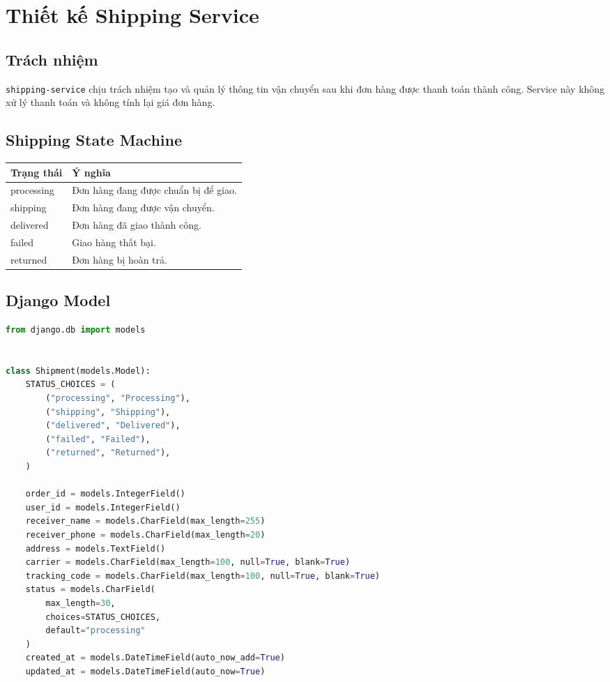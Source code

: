 \section{Thiết kế Shipping Service}

\subsection{Trách nhiệm}

\texttt{shipping-service} chịu trách nhiệm tạo và quản lý thông tin vận chuyển sau khi đơn hàng được thanh toán thành công. Service này không xử lý thanh toán và không tính lại giá đơn hàng.

\subsection{Shipping State Machine}

\begin{longtable}{|p{4cm}|p{9cm}|}
\hline
\textbf{Trạng thái} & \textbf{Ý nghĩa} \\
\hline
processing & Đơn hàng đang được chuẩn bị để giao. \\
\hline
shipping & Đơn hàng đang được vận chuyển. \\
\hline
delivered & Đơn hàng đã giao thành công. \\
\hline
failed & Giao hàng thất bại. \\
\hline
returned & Đơn hàng bị hoàn trả. \\
\hline
\end{longtable}

\subsection{Django Model}

\begin{lstlisting}[style=code,language=Python]
from django.db import models


class Shipment(models.Model):
    STATUS_CHOICES = (
        ("processing", "Processing"),
        ("shipping", "Shipping"),
        ("delivered", "Delivered"),
        ("failed", "Failed"),
        ("returned", "Returned"),
    )

    order_id = models.IntegerField()
    user_id = models.IntegerField()
    receiver_name = models.CharField(max_length=255)
    receiver_phone = models.CharField(max_length=20)
    address = models.TextField()
    carrier = models.CharField(max_length=100, null=True, blank=True)
    tracking_code = models.CharField(max_length=100, null=True, blank=True)
    status = models.CharField(
        max_length=30,
        choices=STATUS_CHOICES,
        default="processing"
    )
    created_at = models.DateTimeField(auto_now_add=True)
    updated_at = models.DateTimeField(auto_now=True)
\end{lstlisting}

